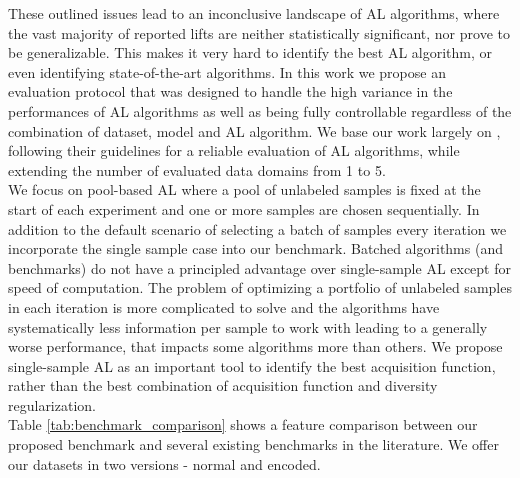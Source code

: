 \documentclass[]{article}
\begin{document}
These outlined issues lead to an inconclusive landscape of AL algorithms, where the vast majority of reported lifts are neither statistically significant, nor prove to be generalizable.
This makes it very hard to identify the best AL algorithm, or even identifying state-of-the-art algorithms.
In this work we propose an evaluation protocol that was designed to handle the high variance in the performances of AL algorithms as well as being fully controllable regardless of the combination of dataset, model and AL algorithm. 
We base our work largely on \cite{ji2023randomness}, following their guidelines for a reliable evaluation of AL algorithms, while extending the number of evaluated data domains from 1 to 5. \\
We focus on pool-based AL where a pool of unlabeled samples is fixed at the start of each experiment and one or more samples are chosen sequentially.
In addition to the default scenario of selecting a batch of samples every iteration we incorporate the single sample case into our benchmark.
Batched algorithms (and benchmarks) do not have a principled advantage over single-sample AL except for speed of computation.
The problem of optimizing a portfolio of unlabeled samples in each iteration is more complicated to solve and the algorithms have systematically less information per sample to work with leading to a generally worse performance, that impacts some algorithms more than others. 
We propose single-sample AL as an important tool to identify the best acquisition function, rather than the best combination of acquisition function and diversity regularization. \\
Table \ref{tab:benchmark_comparison} shows a feature comparison between our proposed benchmark and several existing benchmarks in the literature. 
We offer our datasets in two versions - normal and encoded.
\end{document}
